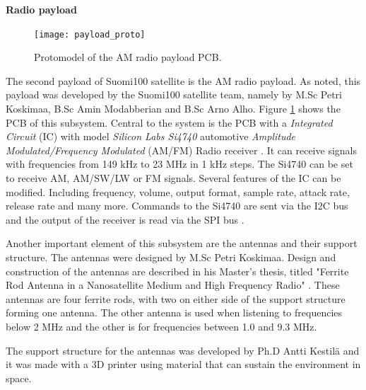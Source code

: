 \documentclass[english,12pt,a4paper,pdftex,elec,utf8]{aaltothesis}
\begin{document}
\textbf{Radio payload}\par  
\begin{figure}[h!]
\centering
\texttt{[image: payload\_proto]}
\caption{Protomodel of the AM radio payload PCB.}
\label{radiopayload}
\end{figure}
The second payload of Suomi100 satellite is the AM radio payload. As noted, this payload was developed by the Suomi100 satellite team, namely by M.Sc Petri Koskimaa, B.Sc Amin Modabberian and B.Sc Arno Alho. Figure \ref{radiopayload} shows the PCB of this subsystem. Central to the system is the PCB with a \textit{Integrated Circuit} (IC) with model \textit{Silicon Labs Si4740} automotive \textit{Amplitude Modulated/Frequency Modulated} (AM/FM) Radio receiver \cite{siinfo}. It can receive signals with frequencies from 149 kHz to 23 MHz in 1 kHz steps. The Si4740 can be set to receive AM, AM/SW/LW or FM signals. Several features of the IC can be modified. Including frequency, volume, output format, sample rate, attack rate, release rate and many more. 
Commands to the Si4740 are sent via the I2C bus and the output of the receiver is read via the SPI bus \cite{sids}. \par 
Another important element of this subsystem are the antennas and their support structure. The antennas were designed by M.Sc Petri Koskimaa. Design and construction of the antennas are described in his Master's thesis, titled "Ferrite Rod Antenna in a Nanosatellite
Medium and High Frequency Radio" \cite{petridippa}. These antennas are four ferrite rods, with two on either side of the support structure forming one antenna. The other antenna is used when listening to frequencies below 2 MHz and the other is for frequencies between 1.0 and 9.3 MHz.\par 
The support structure for the antennas was developed by Ph.D Antti Kestilä and it was made with a 3D printer using material that can sustain the environment in space.\par 
\end{document}
